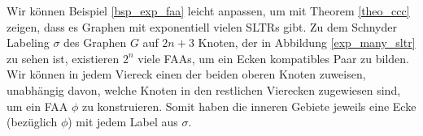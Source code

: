 \begin{example}
Wir können Beispiel \ref{bsp_exp_faa} leicht anpassen, um mit Theorem \ref{theo_ccc} zeigen, dass es Graphen mit exponentiell vielen SLTRs gibt. Zu dem Schnyder Labeling $\sigma$ des Graphen $G$ auf $2n+3$ Knoten, der in Abbildung \ref{exp_many_sltr} zu sehen ist, existieren $2^n$ viele FAAs, um ein Ecken kompatibles Paar zu bilden. Wir können in jedem Viereck einen der beiden oberen Knoten zuweisen, unabhängig davon, welche Knoten in den restlichen Vierecken zugewiesen sind, um ein FAA $\phi$ zu konstruieren. Somit haben die inneren Gebiete jeweils eine Ecke (bezüglich $\phi$) mit jedem Label aus $\sigma$.
\end{example}




